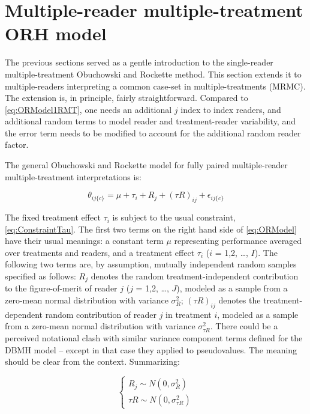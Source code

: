 \documentclass[
]{book}
\begin{document}
\hypertarget{multiple-reader-multiple-treatment-orh-model}{%
\section{Multiple-reader multiple-treatment ORH model}\label{multiple-reader-multiple-treatment-orh-model}}

The previous sections served as a gentle introduction to the single-reader multiple-treatment Obuchowski and Rockette method. This section extends it to multiple-readers interpreting a common case-set in multiple-treatments (MRMC). The extension is, in principle, fairly straightforward. Compared to \eqref{eq:ORModel1RMT}, one needs an additional \(j\) index to index readers, and additional random terms to model reader and treatment-reader variability, and the error term needs to be modified to account for the additional random reader factor.

The general Obuchowski and Rockette model for fully paired multiple-reader multiple-treatment interpretations is:

\begin{equation}
\theta_{ij\{c\}}=\mu+\tau_i+R_j+(\tau R)_{ij}+\epsilon_{ij\{c\}}
\label{eq:ORModel}
\end{equation}

The fixed treatment effect \(\tau_i\) is subject to the usual constraint, \eqref{eq:ConstraintTau}. The first two terms on the right hand side of \eqref{eq:ORModel} have their usual meanings: a constant term \(\mu\) representing performance averaged over treatments and readers, and a treatment effect \(\tau_i\) (\(i\) = 1,2, \ldots, \(I\)). The following two terms are, by assumption, mutually independent random samples specified as follows: \(R_j\) denotes the random treatment-independent contribution to the figure-of-merit of reader \(j\) (\(j\) = 1,2, \ldots, \(J\)), modeled as a sample from a zero-mean normal distribution with variance \(\sigma_R^2\); \((\tau R)_{ij}\) denotes the treatment-dependent random contribution of reader \(j\) in treatment \(i\), modeled as a sample from a zero-mean normal distribution with variance \(\sigma_{\tau R}^2\). There could be a perceived notational clash with similar variance component terms defined for the DBMH model -- except in that case they applied to pseudovalues. The meaning should be clear from the context. Summarizing:

\begin{equation}
\left\{\begin{matrix}
R_j \sim N(0,\sigma_R^2)\\ 
{\tau R} \sim N(0,\sigma_{\tau R}^2)
\end{matrix}\right.
\label{eq:ORVariances}
\end{equation}
\end{document}
